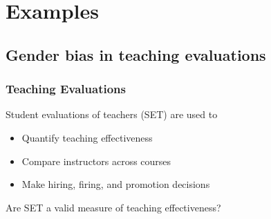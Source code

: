 \documentclass{beamer}
\newcommand{\todo}[1]{{\color{red}{TO DO: \sc #1}}}
\begin{document}

\frame{
\todo{flesh out intro!!}
}

\section[Examples]{Examples}
\subsection[Teaching evaluations]{Gender bias in teaching evaluations}


\frame
{
  \frametitle{Teaching Evaluations}
 \begin{center}
 \Large{ Student evaluations of teachers (SET) are used to} \\
  \begin{itemize}
  \item Quantify teaching effectiveness
  \item Compare instructors across courses
  \item Make hiring, firing, and promotion decisions  
  \end{itemize}
  \vfill
Are SET a valid measure of teaching effectiveness? 
\end{center}
}
\end{document}
